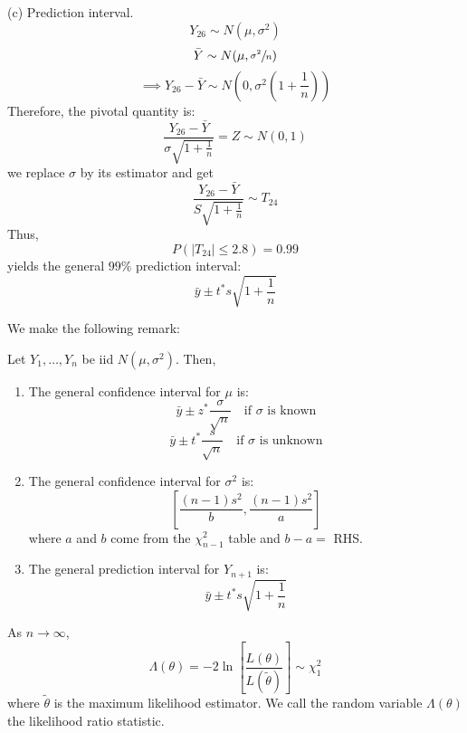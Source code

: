 \begin{exbox}
\begin{example}
        (c) Prediction interval.
        \[ Y_{26} \sim N(\mu,\sigma^2) \]
        \[ \bar{Y} \sim N(\mu,\sfrac{\sigma^2}{n}) \]
        \[ \implies Y_{26}-\bar{Y} \sim N\left(0,\sigma^2\left( 1+\frac{1}{n}  \right)\right) \]
        Therefore, the pivotal quantity is:
        \[ \frac{Y_{26}-\bar{Y}}{\sigma \sqrt{1+\frac{1}{n}}} =Z \sim N(0,1) \]
        we replace $ \sigma $ by its estimator and get
        \[ \frac{Y_{26}-\bar{Y}}{S \sqrt{1+\frac{1}{n}}} \sim T_{24} \]
        Thus,
        \[ P(|T_{24}|\leqslant 2.8)=0.99 \]
        yields the general $ 99\% $ prediction interval:
        \[ \bar{y}\pm t^* s \sqrt{1+\frac{1}{n}} \]
    \end{example}
\end{exbox}
We make the following remark:
\begin{remark} Let $ Y_1,\ldots ,Y_{n} $ be iid $ N(\mu,\sigma^2) $. Then,
    \begin{enumerate}[label=(\roman*)]
        \item The general confidence interval for $ \mu $ is:
              \[ \bar{y}\pm z^* \frac{\sigma}{\sqrt{n}} \quad\text{if $\sigma$ is known} \]
              \[ \bar{y}\pm t^* \frac{s}{\sqrt{n}} \quad\text{if $\sigma$ is unknown} \]
        \item The general confidence interval for $ \sigma^2 $ is:
              \[ \left[ \frac{(n-1)s^2}{b} ,\frac{(n-1)s^2}{a} \right] \]
              where $ a $ and $ b $ come from the $ \chi^2_{n-1} $ table
              and $ b-a= $ RHS\@.
        \item The general prediction interval for $ Y_{n+1} $ is:
              \[ \bar{y}\pm t^* s \sqrt{1+\frac{1}{n}} \]
    \end{enumerate}
\end{remark}

\begin{thmbox}
    \begin{theorem}
        As $ n\to \infty $,
        \[ \Lambda(\theta)=-2\ln\left[  \frac{L(\theta)}{L(\tilde{\theta})} \right] \sim \chi^2_1  \]
        where $ \tilde{\theta} $ is the maximum likelihood estimator. We call the random
        variable $ \Lambda(\theta) $ the likelihood ratio statistic.
    \end{theorem}
\end{thmbox}

